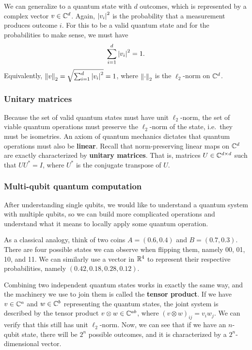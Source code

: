 \documentclass[a4paper,draft]{article}
\begin{document}
We can generalize to a quantum state with $d$ outcomes, which is
represented by a complex vector $v \in \mathbb{C}^d$. Again, $\left\lvert v_i\right\rvert^2$ is the
probability that a measurement produces outcome $i$. For this to be a
valid quantum state and for the probabilities to make sense, we must have
\[
  \sum_{i=1}^d \left\lvert v_i\right\rvert^2 = 1.
\]
Equivalently, $\left\lVert v\right\rVert_2 = \sqrt{\sum_{i=1}^d \left\lvert v_i\right\rvert^2} = 1$, where
  $\left\lVert \cdot\right\rVert_2$ is the $\ell_2$-norm on $\mathbb{C}^d$.

\subsubsection*{Unitary matrices}

Because the set of valid quantum states must have unit $\ell_2$-norm, the
set of viable quantum operations must preserve the $\ell_2$-norm of the
state, i.e.\ they must be isometries. An axiom of quantum mechanics
dictates that quantum operations must also be \textbf{linear}. Recall that
norm-preserving linear maps on $\mathbb{C}^d$ are exactly characterized by
\textbf{unitary matrices}. That is, matrices $U \in \mathbb{C}^{d \times d}$ such
that $U U^* = I$, where $U^*$ is the conjugate transpose of $U$.

\subsubsection*{Multi-qubit quantum computation}

After understanding single qubits, we would like to understand a quantum
system with multiple qubits, so we can build more complicated operations
and understand what it means to locally apply some quantum operation.

As a classical analogy, think of two coins $A = (0.6, 0.4)$ and $B = (0.7,
0.3)$. There are four possible states we can observe when flipping them,
namely 00, 01, 10, and 11. We can similarly use a vector in $\mathbb{R}^4$ to
represent their respective probabilities, namely $(0.42, 0.18, 0.28,
0.12)$.

Combining two independent quantum states works in exactly the same way,
and the machinery we use to join them is called the \textbf{tensor
product}. If we have $v \in \mathbb{C}^a$ and $w \in \mathbb{C}^b$ representing the
quantum states, the joint system is described by the tensor product $v
\otimes w \in \mathbb{C}^{ab}$, where $(v \otimes w)_{ij} = v_i w_j$. We can
verify that this still has unit $\ell_2$-norm. Now, we can see that if we
have an $n$-qubit state, there will be $2^n$ possible outcomes, and it is
characterized by a $2^n$-dimensional vector.
\end{document}
